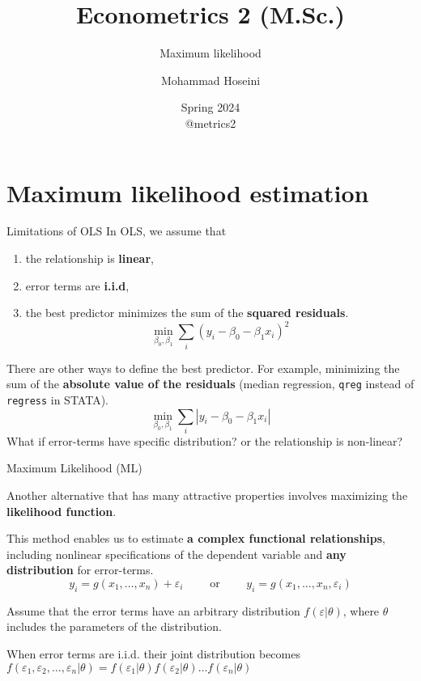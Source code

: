 \documentclass{beamer}
\begin{document}
	\title[Econometrics 2]{Econometrics 2 (M.Sc.)}
	\subtitle{Maximum likelihood}
	\author[Mohammad Hoseini]{Mohammad Hoseini}
	
	
	\date[Spring 2024]{Spring 2024 \\
	\vspace{10pt} @metrics2
}

	
\begin{frame}[plain]
	\titlepage
\end{frame}

\section{Maximum likelihood estimation}

\begin{frame}{Limitations of OLS}
In OLS, we assume that 
\begin{enumerate}
	\item the relationship is \textbf{linear}, 
	\item error terms are \textbf{i.i.d}, %
	\item the best predictor minimizes the sum of the \textbf{squared residuals}.\[\min_{\beta_0,\beta_1} \sum_{i}(y_i-\beta_0-\beta_1x_i)^2 \]
\end{enumerate}


There are other ways to define the best predictor. 
For example, minimizing the sum of the \textbf{absolute value of the residuals} (median regression, \texttt{qreg} instead of \texttt{regress} in STATA).\[\min_{\beta_0,\beta_1} \sum_{i}|y_i-\beta_0-\beta_1x_i| \] 
What if error-terms have specific distribution? or the relationship is non-linear?
\end{frame}

\begin{frame}{Maximum Likelihood (ML)}

Another alternative that has many attractive properties involves maximizing the \textbf{likelihood function}.\bigskip

This method enables us to estimate \textbf{a complex functional relationships}, including nonlinear specifications of the dependent variable and \textbf{any distribution} for error-terms. \[y_i=g(x_1,\dots,x_n)+\varepsilon_i \qquad\text{ or } \qquad y_i=g(x_1,\dots,x_n,\varepsilon_i)\]



Assume that the error terms have an arbitrary distribution $f(\varepsilon|\theta)$, where $\theta$ includes the parameters of the distribution.\bigskip

When error terms are i.i.d. their joint distribution becomes $f(\varepsilon_1,\varepsilon_2,\dots,\varepsilon_n|\theta)=f(\varepsilon_1|\theta)f(\varepsilon_2|\theta)\dots f(\varepsilon_n|\theta)$ 
\end{frame}
\end{document}
